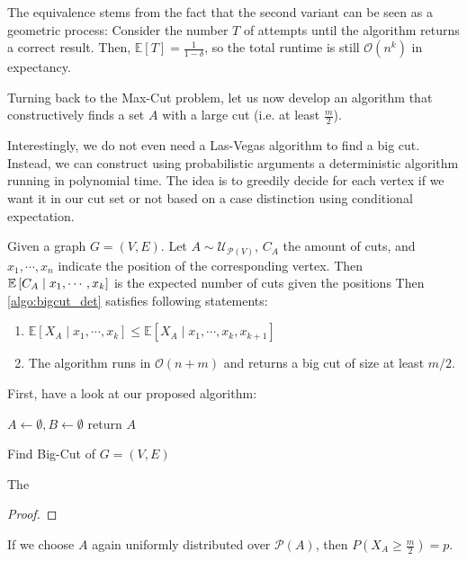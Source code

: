 \begin{remark}
    The equivalence stems from the fact that the second variant can be seen as a geometric process:
    Consider the number $T$ of attempts until the algorithm returns a correct result.
    Then, $\mathbb{E}[T] = \frac{1}{1-\delta}$, so the total runtime is still $\mathcal{O}(n^k)$ in expectancy.
\end{remark}
Turning back to the Max-Cut problem, let us now develop an algorithm
that constructively finds a set $A$ with a large cut (i.e. at least $\frac{m}{2}$).

Interestingly, we do not even need a Las-Vegas algorithm to find a big cut.
Instead, we can construct using probabilistic arguments a deterministic algorithm running in polynomial time.
The idea is to greedily decide for each vertex if we want it in our cut set or not
based on a case distinction using conditional expectation.
\begin{theorem}
    Given a graph $G = (V,E)$.
    Let $A \sim \mathcal{U}_{\mathcal{P}(V)}$, $C_A$ the amount of cuts,
    and $x_1, \cdots, x_n$ indicate the position of the corresponding vertex.
    Then $\mathbb{E}\left[C_A \mid x_1, \cdots, x_k\right]$ is the expected number of cuts given the positions
    Then \autoref{algo:bigcut_det} satisfies following statements:
    \begin{enumerate}
        \item $\mathbb{E}[X_A \mid x_1, \cdots, x_k] \leq \mathbb{E}[X_A \mid x_1, \cdots, x_k, x_{k+1}]$
        \item The algorithm runs in $\mathcal{O}(n+m)$
              and returns a big cut of size at least $m/2$.
    \end{enumerate}
\end{theorem}
First, have a look at our proposed algorithm:
\begin{algorithm}[H]
    \label{algo:bigcut_det}
    \SetAlgoLined
    $A \leftarrow \emptyset, B \leftarrow \emptyset$
    return $A$
    \caption{Find Big-Cut of $G = (V,E)$}
\end{algorithm}
The
\begin{proof}

\end{proof}


If we choose $A$ again uniformly distributed over $\mathcal{P}(A)$,
then $P(X_A \geq \frac{m}{2}) = p$.


